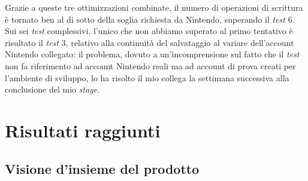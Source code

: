 Grazie a queste tre ottimizzazioni combinate, il numero di operazioni di scrittura è tornato ben al di sotto della soglia richiesta da Nintendo, superando il \textit{test} 6. Sui sei \textit{test} complessivi, l'unico che non abbiamo superato al primo tentativo è risultato il \textit{test} 3, relativo alla continuità del salvataggio al variare dell'account Nintendo collegato: il problema, dovuto a un'incomprensione sul fatto che il \textit{test} non fa riferimento ad account Nintendo reali ma ad account di prova creati per l'ambiente di sviluppo, lo ha risolto il mio collega la settimana successiva alla conclusione del mio \textit{stage}.



\section{Risultati raggiunti}
 
\subsection{Visione d'insieme del prodotto}

 
